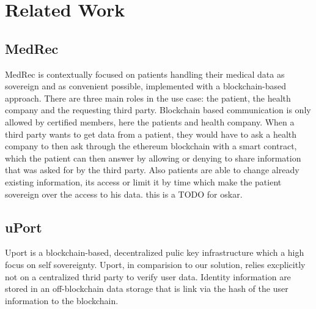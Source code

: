 \chapter{Related Work}
\label{cha:relatedwork}

\section{MedRec}

MedRec is contextually focused on patients handling their medical data as sovereign and as convenient possible,
implemented with a blockchain-based approach.
There are three main roles in the use case: the patient, the health company and the requesting third party.
Blockchain based communication is only allowed by certified members, here the patients and health company.
When a third party wants to get data from a patient, they would have to ask a health company to then ask through the
ethereum blockchain with a smart contract, which the patient can then answer by allowing or denying to share
information that was asked for by the third party.
Also patients are able to change already existing information, its access or limit it by time which make the patient
sovereign over the access to his data.
this is a TODO for oskar.

\section{uPort}
Uport is a blockchain-based, decentralized pulic key infrastructure which a high focus on self sovereignty. Uport, in comparision to our solution, relies excplicitly not on a centralized thrid party to verify user data.\cite[p. 2]{uPortWhitePaper}
Identity information are stored in an off-blockchain data storage that is link via the hash of the user information to the blockchain. 

